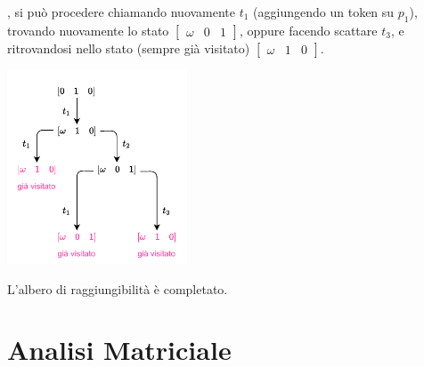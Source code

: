 \documentclass[10pt, letterpaper]{report}
\begin{document}
, si può procedere chiamando nuovamente $t_1$ (aggiungendo un token su $p_1$), trovando nuovamente lo stato $\begin{bmatrix}
    \omega & 0 & 1
\end{bmatrix}$, oppure facendo scattare $t_3$, e ritrovandosi nello stato (sempre già visitato) $\begin{bmatrix}
    \omega & 1 & 0
\end{bmatrix}$.
\begin{center}
    \includegraphics[width=0.4\textwidth]{images/AlberoIll5.drawio.pdf}
\end{center}
L'albero di raggiungibilità è completato.
\flowerLine 
\section{Analisi Matriciale}
\end{document}
